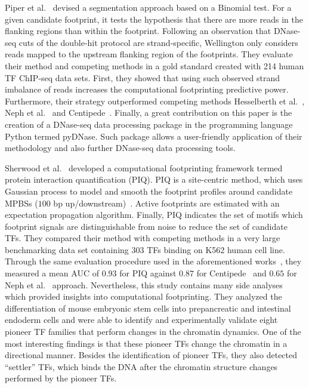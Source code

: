 Piper et al.~\cite{piper2013} devised a segmentation approach based on a Binomial test. For a given candidate footprint, it tests the hypothesis that there are more reads in the flanking regions than within the footprint. Following an observation that DNase-seq cuts of the double-hit protocol are strand-specific, Wellington only considers reads mapped to the upstream flanking region of the footprints. They evaluate their method and competing methods in a gold standard created with 214 human TF ChIP-seq data sets. First, they showed that using such observed strand imbalance of reads increases the computational footprinting predictive power. Furthermore, their strategy outperformed competing methods Hesselberth et al.~\cite{hesselberth2009}, Neph et al.~\cite{neph2012a} and Centipede~\cite{pique2011}. Finally, a great contribution on this paper is the creation of a DNase-seq data processing package in the programming language Python termed pyDNase. Such package allows a user-friendly application of their methodology and also further DNase-seq data processing tools.

Sherwood et al.~\cite{sherwood2014} developed a computational footprinting framework termed protein interaction quantification (PIQ). PIQ is a site-centric method, which uses Gaussian process to model and smooth the footprint profiles around candidate MPBSs ($100$ bp up/downstream)~\cite{sherwood2014}. Active footprints are estimated with an expectation propagation algorithm. Finally, PIQ indicates the set of motifs which footprint signals are distinguishable from noise to reduce the set of candidate TFs. They compared their method with competing methods in a very large benchmarking data set containing $303$ TFs binding on K562 human cell line. Through the same evaluation procedure used in the aforementioned works~\cite{pique2011,cuellar2012,piper2013}, they measured a mean AUC of $0.93$ for PIQ against $0.87$ for Centipede~\cite{pique2011} and $0.65$ for Neph et al.~\cite{neph2012a} approach. Nevertheless, this study contains many side analyses which provided insights into computational footprinting. They analyzed the differentiation of mouse embryonic stem cells into prepancreatic and intestinal endoderm cells and were able to identify and experimentally validate eight pioneer TF families that perform changes in the chromatin dynamics. One of the most interesting findings is that these pioneer TFs change the chromatin in a directional manner. Besides the identification of pioneer TFs, they also detected ``settler'' TFs, which binds the DNA after the chromatin structure changes performed by the pioneer TFs.

